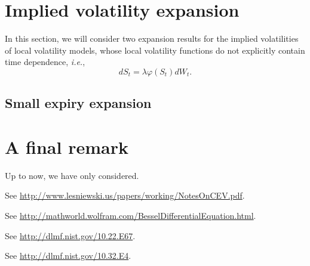\documentclass[12pt]{article}
\begin{document}
\section{Implied volatility expansion}

  In this section, we will consider two expansion results for the implied volatilities of local volatility models,
  whose local volatility functions do not explicitly contain time dependence, {\it i.e.},
  \begin{equation}
    dS_t=\lambda\varphi(S_t)dW_t.
  \end{equation}

  \subsection{Small expiry expansion}

\section{A final remark}

  Up to now, we have only considered.




\begin{thebibliography}{99}
    See \url{http://www.lesniewski.us/papers/working/NotesOnCEV.pdf}.

    See \url{http://mathworld.wolfram.com/BesselDifferentialEquation.html}.

    See \url{http://dlmf.nist.gov/10.22.E67}.

    See \url{http://dlmf.nist.gov/10.32.E4}.
\end{thebibliography}
\end{document}
